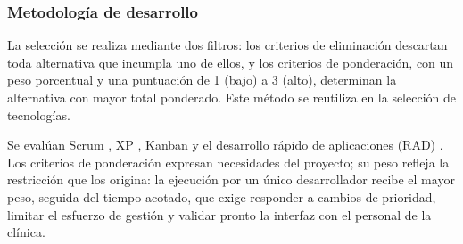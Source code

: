 \subsubsection{Metodología de desarrollo}

La selección se realiza mediante dos filtros: los criterios de eliminación descartan toda alternativa que incumpla uno de ellos, y los criterios de ponderación, con un peso porcentual y una puntuación de 1 (bajo) a 3 (alto), determinan la alternativa con mayor total ponderado. Este método se reutiliza en la selección de tecnologías.

Se evalúan Scrum \cite{schwaber2020scrum}, XP \cite{beck2004extreme}, Kanban \cite{anderson2010kanban} y el desarrollo rápido de aplicaciones (RAD) \cite{martin1991rapid}. Los criterios de ponderación expresan necesidades del proyecto; su peso refleja la restricción que los origina: la ejecución por un único desarrollador recibe el mayor peso, seguida del tiempo acotado, que exige responder a cambios de prioridad, limitar el esfuerzo de gestión y validar pronto la interfaz con el personal de la clínica.

